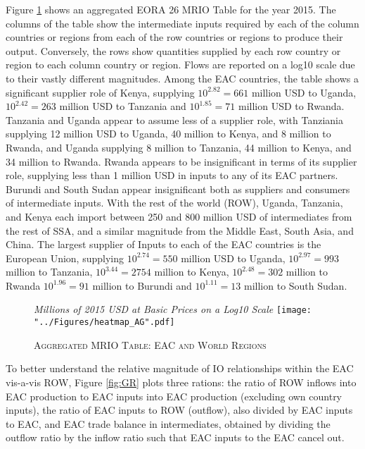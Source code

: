 \documentclass[a4paper]{article}
\begin{document}
Figure \ref{fig:wld} shows an aggregated EORA 26 MRIO Table for the year 2015.  The columns of the table show the intermediate inputs required by each of the column countries or regions from each of the row countries or regions to produce their output. Conversely, the rows show quantities supplied by each row country or region to each column country or region. Flows are reported on a log10 scale due to their vastly different magnitudes. Among the EAC countries, the table shows a significant supplier role of Kenya, supplying $10^{2.82} = 661$ million USD to Uganda, $10^{2.42} = 263$ million USD to Tanzania and  $10^{1.85} = 71$ million USD to Rwanda. Tanzania and Uganda appear to assume less of a supplier role, with Tanziania supplying 12 million USD to Uganda, 40 million to Kenya, and 8 million to Rwanda, and Uganda supplying 8 million to Tanzania, 44 million to Kenya, and 34 million to Rwanda. Rwanda appears to be insignificant in terms of its supplier role, supplying less than 1 million USD in inputs to any of its EAC partners. Burundi and South Sudan appear insignificant both as suppliers and consumers of intermediate inputs. With the rest of the world (ROW), Uganda, Tanzania, and Kenya each import between 250 and 800 million USD of intermediates from the rest of SSA, and a similar magnitude from the Middle East, South Asia, and China. The largest supplier of Inputs to each of the EAC countries is the European Union, supplying $10^{2.74} = 550$ million USD to Uganda, $10^{2.97} = 993$ million to Tanzania, $10^{3.44} = 2754$ million to Kenya, $10^{2.48} = 302$ million to Rwanda  $10^{1.96} = 91$ million to Burundi and $10^{1.11} = 13$ million to South Sudan. 


\begin{figure}[h!]
\centering
\caption{\label{fig:wld}\textsc{Aggregated MRIO Table: EAC and World Regions}}
\small{\textit{Millions of 2015 USD at Basic Prices on a Log10 Scale}}
\texttt{[image: "../Figures/heatmap\_AG".pdf]} %
\end{figure}
\FloatBarrier

To better understand the relative magnitude of IO relationships within the EAC vis-a-vis ROW, Figure \ref{fig:GR} plots three rations: the ratio of ROW inflows into EAC production to EAC inputs into EAC production (excluding own country inputs), the ratio of EAC inputs to ROW (outflow), also divided by EAC inputs to EAC, and EAC trade balance in intermediates, obtained by dividing the outflow ratio by the inflow ratio such that EAC inputs to the EAC cancel out. 
\end{document}

